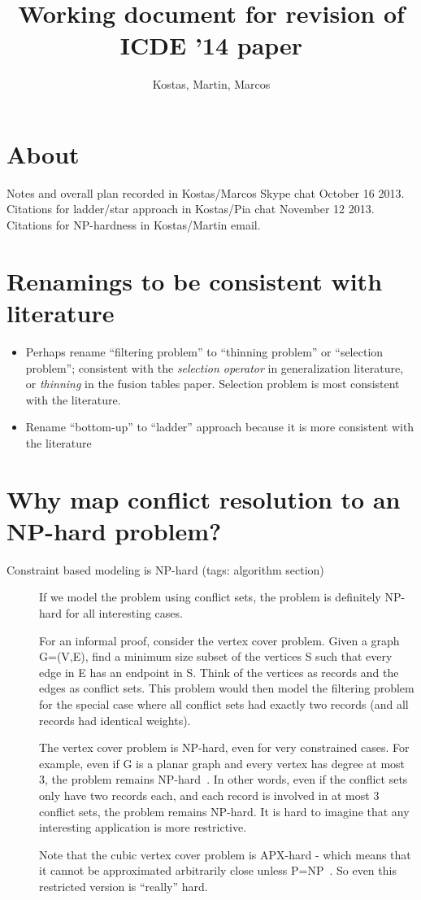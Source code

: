 \documentclass[11pt, oneside]{article}   	%
\title{Working document for revision of ICDE '14 paper}
\author{Kostas, Martin, Marcos}
\begin{document}
\maketitle

\section{About}
Notes and overall plan recorded in Kostas/Marcos Skype chat October 16 2013. Citations for ladder/star approach in Kostas/Pia chat November 12 2013. Citations for NP-hardness in Kostas/Martin email.

\section{Renamings to be consistent with literature}

\begin{itemize}
\item Perhaps rename ``filtering problem'' to ``thinning problem'' or ``selection problem''; consistent with the \emph{selection operator} in generalization literature, or \emph{thinning} in the fusion tables paper. Selection problem is most consistent with the literature.
\item Rename ``bottom-up'' to ``ladder'' approach because it is more consistent with the literature~\cite{foerster2010challenges}
\end{itemize}

\section{Why map conflict resolution to an NP-hard problem?}

\begin{description}
\item[Constraint based modeling is NP-hard (tags: algorithm section)] If we model the problem using conflict sets, the problem is
definitely NP-hard for all interesting cases.

For an informal proof, consider the vertex cover problem. Given a graph G=(V,E),
find a minimum size subset of the vertices S such that every edge in E
has an endpoint in S. Think of the vertices as records and the edges
as conflict sets. This problem would then model the filtering problem
for the special case where all conflict sets had exactly two records
(and all records had identical weights).

The vertex cover problem is NP-hard, even for very constrained cases.
For example, even if G is a planar graph and every vertex has degree
at most 3, the problem remains NP-hard~\cite{garey1977rectilinear}. In other words, even if the
conflict sets only have two records each, and each record is involved
in at most 3 conflict sets, the problem remains NP-hard. It is hard to
imagine that any interesting application is more restrictive.

Note that the cubic vertex cover problem is APX-hard - which
means that it cannot be approximated arbitrarily close unless P=NP~\cite{alimonti2000some}. So even this restricted version is ``really'' hard.
\end{description}
\end{document}
